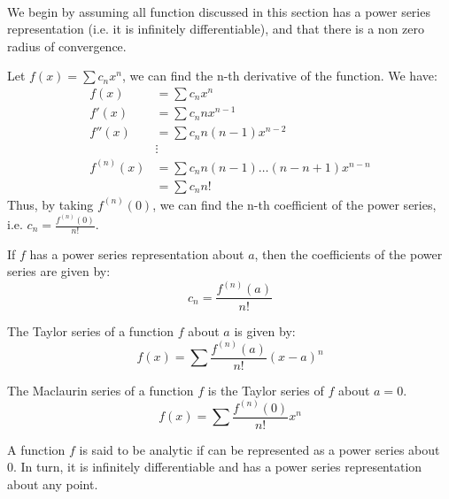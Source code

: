 \documentclass[11pt]{report}
\begin{document}
\paragraph{} We begin by assuming all function discussed in this section has a power series representation (i.e. it is infinitely differentiable), and that there is a non zero radius of convergence.
\begin{example}
    Let $f(x) = \sum c_n x^n$, we can find the n-th derivative of the function. We have:
    \begin{align*}
        f(x) &= \sum c_n x^n \\
        f'(x) &= \sum c_n n x^{n-1} \\
        f''(x) &= \sum c_n n(n-1) x^{n-2} \\
        &\vdots \\
        f^{(n)}(x) &= \sum c_n n(n-1) \ldots (n-n+1) x^{n-n} \\
        &= \sum c_n n!
    \end{align*}
    Thus, by taking $f^{(n)}(0)$, we can find the n-th coefficient of the power series, i.e. $c_n = \frac{f^{(n)}(0)}{n!}$.
\end{example}
\begin{theorem}
    If $f$ has a power series representation about $a$, then the coefficients of the power series are given by:
    \begin{equation}
        c_n = \frac{f^{(n)}(a)}{n!}
    \end{equation}
\end{theorem}
\begin{definition}
    The Taylor series of a function $f$ about $a$ is given by:
    \begin{equation}
        f(x) = \sum \frac{f^{(n)}(a)}{n!} (x-a)^n 
    \end{equation}
\end{definition}
\begin{definition}
    The Maclaurin series of a function $f$ is the Taylor series of $f$ about $a=0$.
    \begin{equation}
        f(x) = \sum \frac{f^{(n)}(0)}{n!} x^n
    \end{equation}
\end{definition}
\begin{definition}
    A function $f$ is said to be analytic if can be represented as a power series about 0. In turn, it is infinitely differentiable and has a power series representation about any point.
\end{definition}
\end{document}
